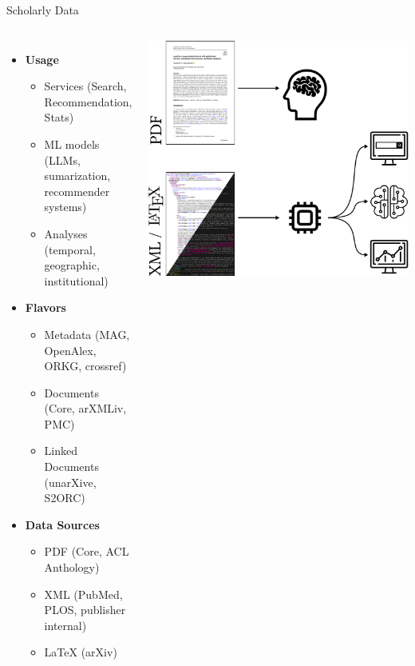 \documentclass[en,16:9,smallfoot]{sdqbeamer}
\begin{document}
   \begin{frame}{Scholarly Data}
   \begin{columns}
        \begin{itemize}
            \item \textbf{Usage}
            \begin{itemize}
                \item Services (Search, Recommendation, Stats)
                \item ML models (LLMs, sumarization, recommender systems) %
                \item Analyses (temporal, geographic, institutional)
            \end{itemize}
            \item \textbf{Flavors}
            \begin{itemize}
                \item Metadata (MAG, OpenAlex, ORKG, crossref)
                \item Documents (Core, arXMLiv, PMC)
                \item Linked Documents (unarXive, S2ORC)
            \end{itemize}
            \item \textbf{Data Sources}
            \begin{itemize}
                \item PDF (Core, ACL Anthology)
                \item XML (PubMed, PLOS, publisher internal)
                \item LaTeX (arXiv)
            \end{itemize}
        \end{itemize}
            \includegraphics[width=\linewidth]{imgs/scholarly_data_background}
   \end{columns}
   \end{frame}
\end{document}
